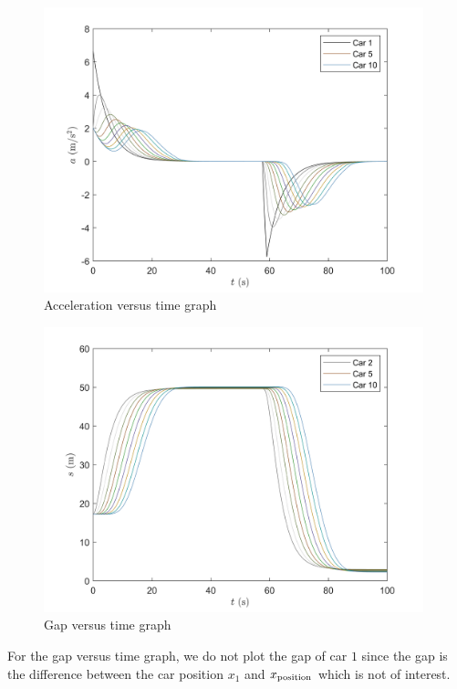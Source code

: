 \documentclass[12pt]{article}
\begin{document}
      \begin{figure}[H]
      \includegraphics[width=11cm]{HomogeneousTraffic3.png}
      \centering
      \caption{Acceleration versus time graph}
      \end{figure}

      \begin{figure}[H]
      \includegraphics[width=11cm]{HomogeneousTraffic4.png}
      \centering
      \caption{Gap versus time graph}
      \end{figure}
      
      For the gap versus time graph, we do not plot the gap of car $1$ since the gap is the difference between the car position $x_1$ and $x_{\rm position}$ which is not of interest. 
\end{document}
